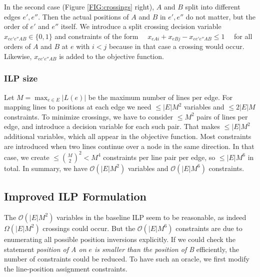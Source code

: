 \documentclass{llncs}
\begin{document}
In the second case (Figure \ref{FIG:crossings} right), $A$ and $B$ split into different edges $e', e''$. Then the actual positions of $A$ and $B$ in $e', e''$ do not matter, but the order of $e'$ and $e''$ itself. We introduce a split crossing decision variable $x_{ee'e''AB} \in \{0,1\}$ and constraints of the form
$\quad x_{eAi} + x_{eBj} - x_{ee'e''AB} \leq 1 \quad$
for all orders of $A$ and $B$ at $e$ with $i < j$ because in that case a crossing would occur. Likewise, $x_{ee'e''AB}$ is added to the objective function.

\subsubsection{ILP size}
Let $M = \max_{e \in E} |L(e)|$ be the maximum number of lines per edge. For mapping lines to positions at each edge we need $\leq |E|M^{2}$ variables and $\leq 2|E|M$ constraints. To minimize crossings, we have to consider $\leq M^{2}$ pairs of lines per edge, and introduce a decision variable for each such pair. That makes $\leq |E| M^{2}$ additional variables, which all appear in the objective function. Most constraints are introduced when two lines continue over a node in the same direction. In that case, we create $\leq \binom{M}{2}^{2} < M^{4}$ constraints per line pair per edge, so $\leq |E| M^{6}$ in total.
In summary, we have $\mathcal{O}(|E|M^{2})$ variables and $\mathcal{O}(|E|M^{6})$ constraints.

%
\subsection{Improved ILP Formulation}\label{SEC:improved}
%
The $\mathcal{O}(|E|M^{2})$ variables in the baseline ILP seem to be reasonable, as indeed $\Omega(|E|M^{2})$ crossings could occur. But the $\mathcal{O}(|E|M^{6})$ constraints are due to enumerating all possible position inversions explicitly. If we could check the statement \emph{position of A on $e$ is smaller than the position of B} efficiently, the number of constraints could be reduced. To have such an oracle, we first modify the line-position assignment constraints.
\end{document}
